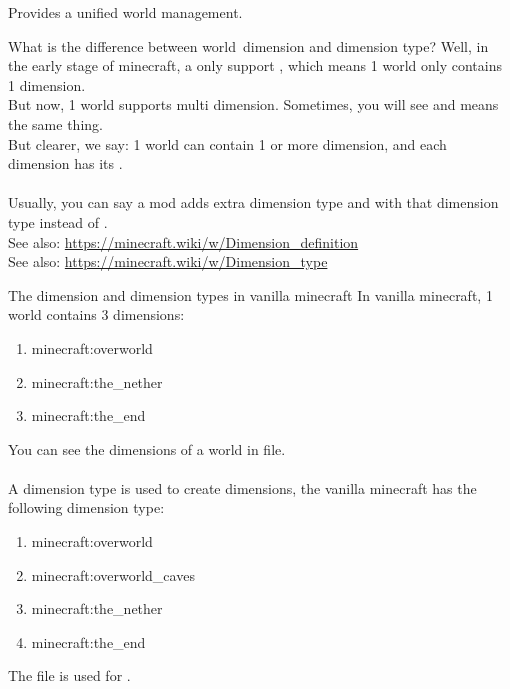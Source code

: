 
Provides a unified world management.



\begin{example}{What is the difference between world\tcomma\ dimension and dimension type?}
    Well, in the early stage of minecraft, a  only support , which means 1 world only contains 1 dimension.\\
    But now, 1 world supports multi dimension.
    Sometimes, you will see  and  means the same thing.\\
    But clearer, we say: 1 world can contain 1 or more dimension, and each dimension has its .\\
    \\
    Usually, you can say a mod adds extra dimension type and  with that dimension type instead of .\\
    See also: \url{https://minecraft.wiki/w/Dimension_definition}\\
    See also: \url{https://minecraft.wiki/w/Dimension_type}
\end{example}

\begin{tips}{The dimension and dimension types in vanilla minecraft}
    In vanilla minecraft, 1 world contains 3 dimensions:
    \begin{enumerate}
        \item minecraft:overworld
        \item minecraft:the\_nether
        \item minecraft:the\_end
    \end{enumerate}
    You can see the dimensions of a world in  file.\\
    \\
    A dimension type is used to create dimensions, the vanilla minecraft has the following dimension type:
    \begin{enumerate}
        \item minecraft:overworld
        \item minecraft:overworld\_caves
        \item minecraft:the\_nether
        \item minecraft:the\_end
    \end{enumerate}

    The file  is used for .
\end{tips}

